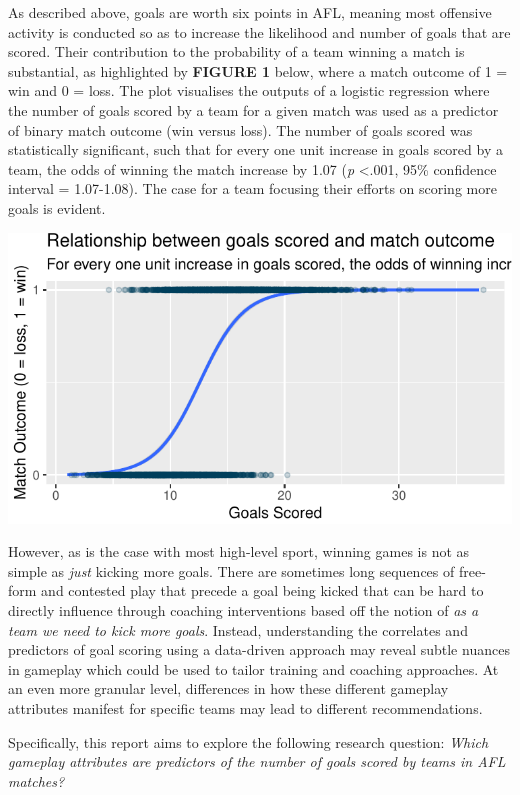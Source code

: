 \documentclass{article}
\begin{document}
As described above, goals are worth six points in AFL, meaning most
offensive activity is conducted so as to increase the likelihood and
number of goals that are scored. Their contribution to the probability
of a team winning a match is substantial, as highlighted by
\textbf{FIGURE 1} below, where a match outcome of 1 = win and 0 = loss.
The plot visualises the outputs of a logistic regression where the
number of goals scored by a team for a given match was used as a
predictor of binary match outcome (win versus loss). The number of goals
scored was statistically significant, such that for every one unit
increase in goals scored by a team, the odds of winning the match
increase by 1.07 (\emph{p} \textless.001, 95\% confidence interval =
1.07-1.08). The case for a team focusing their efforts on scoring more
goals is evident.

\includegraphics{OLET5608_TrentHenderson_files/figure-latex/unnamed-chunk-2-1.pdf}

However, as is the case with most high-level sport, winning games is not
as simple as \emph{just} kicking more goals. There are sometimes long
sequences of free-form and contested play that precede a goal being
kicked that can be hard to directly influence through coaching
interventions based off the notion of \emph{as a team we need to kick
more goals}. Instead, understanding the correlates and predictors of
goal scoring using a data-driven approach may reveal subtle nuances in
gameplay which could be used to tailor training and coaching approaches.
At an even more granular level, differences in how these different
gameplay attributes manifest for specific teams may lead to different
recommendations.

Specifically, this report aims to explore the following research
question: \emph{Which gameplay attributes are predictors of the number
of goals scored by teams in AFL matches?}
\end{document}
